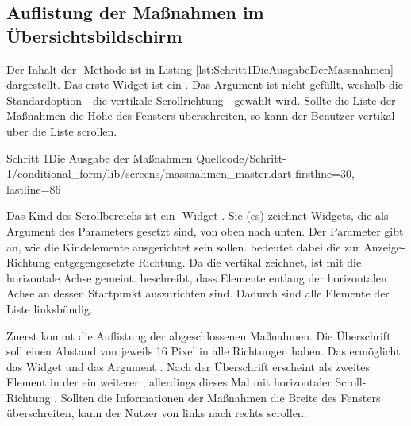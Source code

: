\subsection{Auflistung der Maßnahmen im Übersichtsbildschirm}

Der Inhalt der -Methode ist in Listing \ref{lst:Schritt1DieAusgabeDerMassnahmen} dargestellt.
Das erste Widget ist ein  .
Das Argument  ist nicht gefüllt, weshalb die Standardoption - die vertikale Scrollrichtung - gewählt wird.
Sollte die Liste der Maßnahmen die Höhe des Fensters überschreiten, so kann der Benutzer vertikal über die Liste scrollen.

\begin{alexlisting}{Schritt 1}{Die Ausgabe der Maßnahmen}
  {Quellcode/Schritt-1/conditional_form/lib/screens/massnahmen_master.dart}
  {firstline=30, lastline=86}
  \label{lst:Schritt1DieAusgabeDerMassnahmen}
\end{alexlisting}

Das Kind des Scrollbereichs ist ein -Widget .
Sie (es) zeichnet Widgets, die als Argument des Parameters  gesetzt sind, von oben nach unten.
Der Parameter  gibt an, wie die Kindelemente ausgerichtet sein sollen.  bedeutet dabei die zur Anzeige-Richtung entgegengesetzte Richtung. Da die  vertikal zeichnet, ist mit  die horizontale Achse gemeint.  beschreibt, dass Elemente entlang der horizontalen Achse an dessen Startpunkt auszurichten sind. Dadurch sind alle Elemente der Liste linksbündig.

Zuerst kommt die Auflistung der abgeschlossenen Maßnahmen.
Die Überschrift   soll einen Abstand von jeweils 16 Pixel in alle Richtungen haben.
Das ermöglicht das Widget   und das Argument . Nach der Überschrift erscheint als zweites Element in der  ein weiterer  , allerdings dieses Mal mit horizontaler Scroll-Richtung . Sollten die Informationen der Maßnahmen die Breite des Fensters überschreiten, kann der Nutzer von links nach rechts scrollen.


